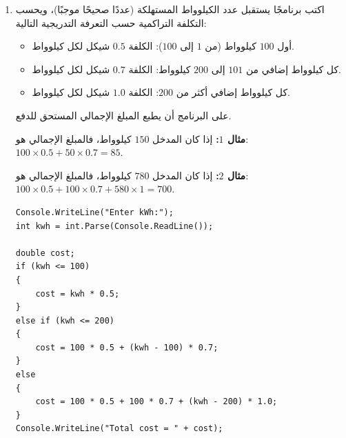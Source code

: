 \documentclass[14pt]{extarticle}
\begin{document}
\begin{enumerate}[resume, itemsep=2.2em]
\item
اكتب برنامجًا يستقبل عدد الكيلوواط المستهلكة (عددًا صحيحًا موجبًا)، ويحسب التكلفة التراكمية حسب التعرفة التدريجية التالية:
\begin{itemize}[nosep]
    \item أول $100$ كيلوواط (من $1$ إلى $100$): الكلفة $0.5$ شيكل لكل كيلوواط.
    \item كل كيلوواط إضافي من $101$ إلى $200$ كيلوواط: الكلفة $0.7$ شيكل لكل كيلوواط.
    \item كل كيلوواط إضافي أكثر من $200$: الكلفة $1.0$ شيكل لكل كيلوواط.
\end{itemize}
على البرنامج أن يطبع المبلغ الإجمالي المستحق للدفع.

\textbf{مثال $1$:} إذا كان المدخل $150$ كيلوواط، فالمبلغ الإجمالي هو:
$100 \times 0.5 + 50 \times 0.7 = 85$.

\textbf{مثال $2$:} إذا كان المدخل $780$ كيلوواط، فالمبلغ الإجمالي هو:
$100 \times 0.5 + 100 \times 0.7 + 580 \times 1 = 700$.

\ifwithsols
\begin{boxSolution}
\begin{english}
\begin{verbatim}
Console.WriteLine("Enter kWh:");
int kwh = int.Parse(Console.ReadLine());

double cost;
if (kwh <= 100)
{
    cost = kwh * 0.5;
}
else if (kwh <= 200)
{
    cost = 100 * 0.5 + (kwh - 100) * 0.7;
}
else
{
    cost = 100 * 0.5 + 100 * 0.7 + (kwh - 200) * 1.0;
}
Console.WriteLine("Total cost = " + cost);
\end{verbatim}
\end{english}
\end{boxSolution}
\fi
\filbreak


\end{enumerate}
\end{document}
